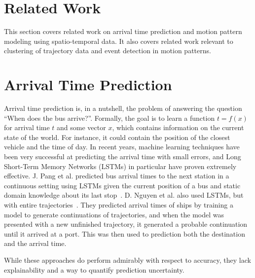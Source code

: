 \section{Related Work}
\label{cha:theory}

This section covers related work on arrival time prediction 
and motion pattern modeling using spatio-temporal data. It
also covers related work relevant to clustering of trajectory data
and event detection in motion patterns.

\section{Arrival Time Prediction}
Arrival time prediction is, in a nutshell, the problem of answering
the question ``When does the bus arrive?''. Formally, the goal is to
learn a function $t = f(x)$ for arrival time $t$ and some vector $x$, which
contains information on the current state of the world. For instance, it
could contain the position of the closest vehicle and the time of day.
In recent years, machine learning techniques have been very successful
at predicting the arrival time with small errors, and Long Short-Term 
Memory Networks (LSTMs) in particular have proven
extremely effective. J. Pang et al. predicted bus arrival times to the next station in a
continuous setting using LSTMs given the current position of a bus and static domain knowledge
about its last stop~\cite{pang2018learning}.
D. Nguyen et al. also used LSTMs, but with entire
trajectories~\cite{Nguyen2018Jun}. They predicted arrival times of
ships by training a model to generate continuations of trajectories, and  
when the model was presented with a new unfinished trajectory, it generated a
probable continuation until it arrived at a port. This was then used to
prediction both the destination and the arrival time.

While these approaches do perform admirably with respect to accuracy, 
they lack explainability and a way to quantify prediction uncertainty.


